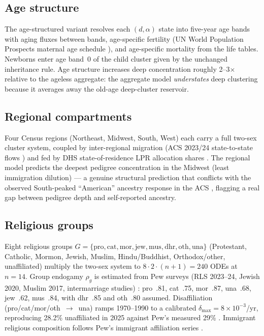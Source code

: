 \documentclass[11pt,a4paper]{article}
\begin{document}
\subsection{Age structure}
\label{sec:age}
The age-structured variant resolves each $(d,\alpha)$ state into
five-year age bands with aging fluxes between bands, age-specific
fertility (UN World Population Prospects maternal age schedule
\cite{unwpp-2024}), and age-specific mortality from the life tables.
Newborns enter age band~0 of the child cluster given by the unchanged
inheritance rule.  Age structure increases deep concentration roughly
2--3$\times$ relative to the ageless aggregate: the aggregate model
\emph{understates} deep clustering because it averages away the
old-age deep-cluster reservoir.

\subsection{Regional compartments}
\label{sec:regional}
Four Census regions (Northeast, Midwest, South, West) each carry a full
two-sex cluster system, coupled by inter-regional migration (ACS 2023/24
state-to-state flows \cite{acs-migration}) and fed by DHS
state-of-residence LPR allocation shares \cite{dhs-table4}.  The
regional model predicts the deepest pedigree concentration in the
Midwest (least immigration dilution) --- a genuine structural
prediction that conflicts with the observed South-peaked ``American''
ancestry response in the ACS \cite{acs-2023-b04006-b05002}, flagging a
real gap between pedigree depth and self-reported ancestry.

\subsection{Religious groups}
\label{sec:religion}
Eight religious groups
$G=\{\mathrm{pro},\mathrm{cat},\mathrm{mor},\mathrm{jew},\mathrm{mus},
\mathrm{dhr},\mathrm{oth},\mathrm{una}\}$
(Protestant, Catholic, Mormon, Jewish, Muslim, Hindu/Buddhist,
Orthodox/other, unaffiliated) multiply the two-sex system to
$8\cdot2\cdot(n+1)=240$ ODEs at $n=14$.  Group endogamy $\rho_g$ is
estimated from Pew surveys (RLS 2023--24, Jewish 2020, Muslim 2017,
intermarriage studies) \cite{pew-rls-2025,pew-intermarriage-2025,
pew-jewish-2021,pew-muslim-2017,pew-rls-2008}: pro~.81, cat~.75,
mor~.87, una~.68, jew~.62, mus~.84, with dhr~.85 and oth~.80 assumed.
Disaffiliation (pro/cat/mor/oth~$\to$~una) ramps 1970--1990 to a
calibrated $\delta_{\max}=8\times10^{-3}$/yr, reproducing 28.2\%
unaffiliated in 2025 against Pew's measured 29\% \cite{pew-rls-2025}.
Immigrant religious composition follows Pew's immigrant affiliation
series \cite{pew-immig-2013}.
\end{document}
